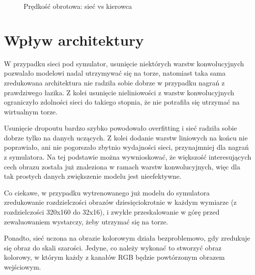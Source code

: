 \begin{figure}
  \centering
  \caption{Prędkość obrotowa: sieć vs kierowca}
  \label{plot_ang}
\end{figure}

\section{Wpływ architektury}
W przypadku sieci pod symulator, usunięcie niektórych warstw konwolucyjnych
pozwalało modelowi nadal utrzymywać się na torze, natomiast taka sama zredukowana architektura 
nie radziła sobie dobrze w przypadku nagrań z prawdziwego łazika. Z kolei
usunięcie nieliniowości z warstw konwolucyjnych ograniczyło zdolności sieci do takiego stopnia,
że nie potrafiła się utrzymać na wirtualnym torze.

Usunięcie dropoutu bardzo szybko powodowało overfitting i sieć radziła sobie
dobrze tylko na danych uczących. Z kolei dodanie warstw liniowych na końcu nie 
poprawiało, ani nie pogorszało zbytnio wydajności sieci, przynajmniej dla
nagrań z symulatora. Na tej podstawie można wywnioskować, że większość interesujących 
cech obrazu została już znaleziona w ramach warstw konwolucyjnych, więc dla tak prostych danych zwiększenie modelu jest nieefektywne.

Co ciekawe, w przypadku wytrenowanego już modelu do symulatora zredukowanie 
rozdzielczości obrazów dziesięciokrotnie w każdym wymiarze (z rozdzielczości 
320x160 do 32x16),
i zwykłe przeskalowanie w górę przed zewaluowaniem wystarczy, żeby utrzymać się 
na torze.

Ponadto, sieć uczona na obrazie kolorowym działa bezproblemowo, gdy
zredukuje się obraz do skali szarości. Jedyne, co należy wykonać to stworzyć obraz kolorowy, w którym każdy z kanałów RGB będzie powtórzonym obrazem wejściowym.

